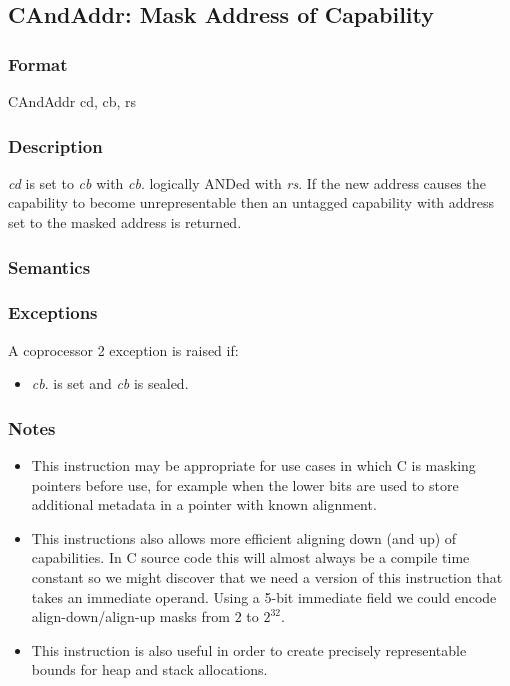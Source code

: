 \clearpage
{}
{}
\subsection*{CAndAddr: Mask Address of Capability}

\subsubsection*{Format}

CAndAddr cd, cb, rs

\begin{center}
\end{center}

\subsubsection*{Description}

\emph{cd} is set to \emph{cb} with \emph{cb}.\caddr{} logically ANDed with \emph{rs}.
If the new address causes the capability to become unrepresentable then an untagged capability with address set to the masked address is returned.

\subsubsection*{Semantics}


\subsubsection*{Exceptions}

A coprocessor 2 exception is raised if:

\begin{itemize}
\item
\emph{cb}.\ctag{} is set and \emph{cb} is sealed.
\end{itemize}

\subsubsection*{Notes}

\begin{itemize}
\item This instruction may be appropriate for use cases in which C is masking pointers
before use, for example when the lower bits are used to store additional metadata in a pointer with known alignment.
\item This instructions also allows more efficient aligning down (and up) of capabilities. In C source code this will
almost always be a compile time constant so we might discover that we need a version of this instruction that
takes an immediate operand. Using a 5-bit immediate field we could encode align-down/align-up masks from
$2$ to $2^{32}$.
\item This instruction is also useful in order to create precisely representable bounds for heap and stack allocations.
\end{itemize}
